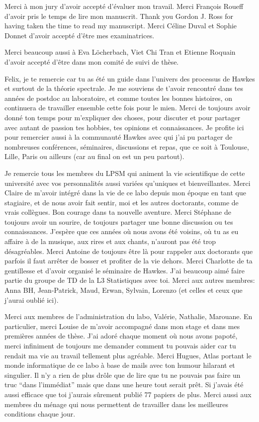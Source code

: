Merci à mon jury d’avoir accepté d’évaluer mon travail. Merci François Roueff d’avoir pris le temps de lire mon manuscrit. Thank you Gordon J. Ross for having taken the time to read my manuscript. Merci Céline Duval et Sophie Donnet d’avoir accepté d’être mes examinatrices. 

Merci beaucoup aussi à Eva Löcherbach, Viet Chi Tran et Etienne Roquain d'avoir accepté d'être dans mon comité de suivi de thèse.

Felix, je te remercie car tu as été un guide dans l’univers des processus de Hawkes et surtout de la théorie spectrale. Je me souviens de t’avoir rencontré dans tes années de postdoc au laboratoire, et comme toutes les bonnes histoires, on continuera de travailler ensemble cette fois pour le mien. Merci de toujours avoir donné ton temps pour m’expliquer des choses, pour discuter et pour partager avec autant de passion tes hobbies, tes opinions et connaissances. 
Je profite ici pour remercier aussi à la communauté Hawkes avec qui j’ai pu partager de nombreuses conférences, séminaires, discussions et repas, que ce soit à Toulouse, Lille, Paris ou ailleurs (car au final on est un peu partout).

Je remercie tous les membres du LPSM qui animent la vie scientifique de cette université avec vos personnalités aussi variées qu’uniques et bienveillantes. Merci Claire de m’avoir intégré dans la vie de ce labo depuis mon époque en tant que stagiaire, et de nous avoir fait sentir, moi et les autres doctorants, comme de vrais collègues. Bon courage dans ta nouvelle aventure. Merci Stéphane de toujours avoir un sourire, de toujours partager une bonne discussion ou tes connaissances. J’espère que ces années où nous avons été voisins, où tu as eu affaire à de la musique, aux rires et aux chants, n’auront pas été trop désagréables. Merci Antoine de toujours être là pour rappeler aux doctorants que parfois il faut arrêter de bosser et profiter de la vie dehors. Merci Charlotte de ta gentillesse et d’avoir organisé le séminaire de Hawkes. J’ai beaucoup aimé faire partie du groupe de TD de la L3 Statistiques avec toi. Merci aux autres membres: Anna BH, Jean-Patrick, Maud, Erwan, Sylvain, Lorenzo (et celles et ceux que j’aurai oublié ici).

Merci aux membres de l’administration du labo, Valérie, Nathalie, Marouane. En particulier, merci Louise de m’avoir accompagné dans mon stage et dans mes premières années de thèse. J’ai adoré chaque moment où nous avons papoté, merci infiniment de toujours me demander comment tu pouvais aider car tu rendait ma vie au travail tellement plus agréable. Merci Hugues, Atlas portant le monde informatique de ce labo à base de mails avec ton humour hilarant et singulier. Il n’y a rien de plus drôle que de lire que tu ne pouvais pas faire un truc “dans l’immédiat” mais que dans une heure tout serait prêt. Si j’avais été aussi efficace que toi j’aurais sûrement publié 77 papiers de plus. Merci aussi aux membres du ménage qui nous permettent de travailler dans les meilleures conditions chaque jour.

